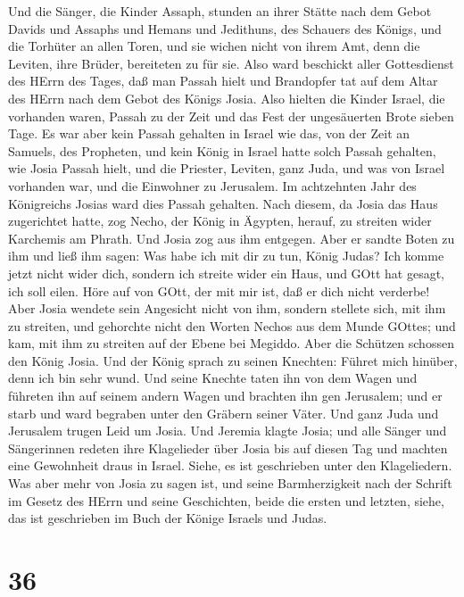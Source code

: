 Und die Sänger, die Kinder Assaph, stunden an ihrer Stätte nach dem
Gebot Davids und Assaphs und Hemans und Jedithuns, des Schauers des
Königs, und die Torhüter an allen Toren, und sie wichen nicht von ihrem
Amt, denn die Leviten, ihre Brüder, bereiteten zu für sie. 
Also ward beschickt aller Gottesdienst des HErrn des Tages, daß man
Passah hielt und Brandopfer tat auf dem Altar des HErrn nach dem Gebot
des Königs Josia.  Also hielten die Kinder Israel, die
vorhanden waren, Passah zu der Zeit und das Fest der ungesäuerten Brote
sieben Tage.  Es war aber kein Passah gehalten in Israel
wie das, von der Zeit an Samuels, des Propheten, und kein König in
Israel hatte solch Passah gehalten, wie Josia Passah hielt, und die
Priester, Leviten, ganz Juda, und was von Israel vorhanden war, und die
Einwohner zu Jerusalem.  Im achtzehnten Jahr des
Königreichs Josias ward dies Passah gehalten.  Nach diesem,
da Josia das Haus zugerichtet hatte, zog Necho, der König in Ägypten,
herauf, zu streiten wider Karchemis am Phrath. Und Josia zog aus ihm
entgegen.  Aber er sandte Boten zu ihm und ließ ihm sagen:
Was habe ich mit dir zu tun, König Judas? Ich komme jetzt nicht wider
dich, sondern ich streite wider ein Haus, und GOtt hat gesagt, ich soll
eilen. Höre auf von GOtt, der mit mir ist, daß er dich nicht verderbe!
 Aber Josia wendete sein Angesicht nicht von ihm, sondern
stellete sich, mit ihm zu streiten, und gehorchte nicht den Worten
Nechos aus dem Munde GOttes; und kam, mit ihm zu streiten auf der Ebene
bei Megiddo.  Aber die Schützen schossen den König Josia.
Und der König sprach zu seinen Knechten: Führet mich hinüber, denn ich
bin sehr wund.  Und seine Knechte taten ihn von dem Wagen
und führeten ihn auf seinem andern Wagen und brachten ihn gen Jerusalem;
und er starb und ward begraben unter den Gräbern seiner Väter. Und ganz
Juda und Jerusalem trugen Leid um Josia.  Und Jeremia
klagte Josia; und alle Sänger und Sängerinnen redeten ihre Klagelieder
über Josia bis auf diesen Tag und machten eine Gewohnheit draus in
Israel. Siehe, es ist geschrieben unter den Klageliedern. 
Was aber mehr von Josia zu sagen ist, und seine Barmherzigkeit nach der
Schrift im Gesetz des HErrn  und seine Geschichten, beide
die ersten und letzten, siehe, das ist geschrieben im Buch der Könige
Israels und Judas.

\hypertarget{section-35}{%
\section{36}\label{section-35}}

